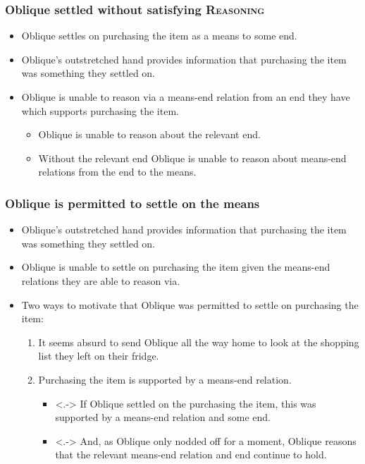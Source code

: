 \documentclass[noamssymb,
graphics,
]{beamer} %
\newcommand{\hand}{\ding{43}}
\newcommand{\schemaName}[1]{\textsc{#1}}
\newcommand{\hozlinedash}[0]{
  \noindent\hdashrule[0.5ex][c]{\textwidth}{.1pt}{2.5pt}
}
\begin{document}
\begin{frame}
  \frametitle{Oblique settled without satisfying \schemaName{Reasoning}}

  \begin{itemize}
  \item Oblique settles on purchasing the item as a means to some end.
  \item Oblique's outstretched hand provides information that purchasing the item was something they settled on.
  \item[\hand] Oblique is unable to reason via a means-end relation from an end they have which supports purchasing the item.
    \begin{itemize}
    \item Oblique is unable to reason about the relevant end.
    \item Without the relevant end Oblique is unable to reason about means-end relations from the end to the means.
    \end{itemize}
  \end{itemize}

\end{frame}


\begin{frame}
  \frametitle{Oblique is permitted to settle on the means}

  \begin{itemize}
  \item<+> Oblique's outstretched hand provides information that purchasing the item was something they settled on.
  \item<+> Oblique is unable to settle on purchasing the item given the means-end relations they are able to reason via.
  \end{itemize}
  \hozlinedash
  \vspace{-15pt}
  \begin{itemize}
  \item<+-> Two ways to motivate that Oblique was permitted to settle on purchasing the item:
    \begin{enumerate}
    \item<+> It seems absurd to send Oblique all the way home to look at the shopping list they left on their fridge.
    \item<+-> Purchasing the item is supported by a means-end relation.
      \begin{itemize}
      \item<.-> If Oblique settled on the purchasing the item, this was supported by a means-end relation and some end.
      \item<.-> And, as Oblique only nodded off for a moment, Oblique reasons that the relevant means-end relation and end continue to hold.
      \end{itemize}
    \end{enumerate}
  \end{itemize}

\end{frame}
\end{document}
